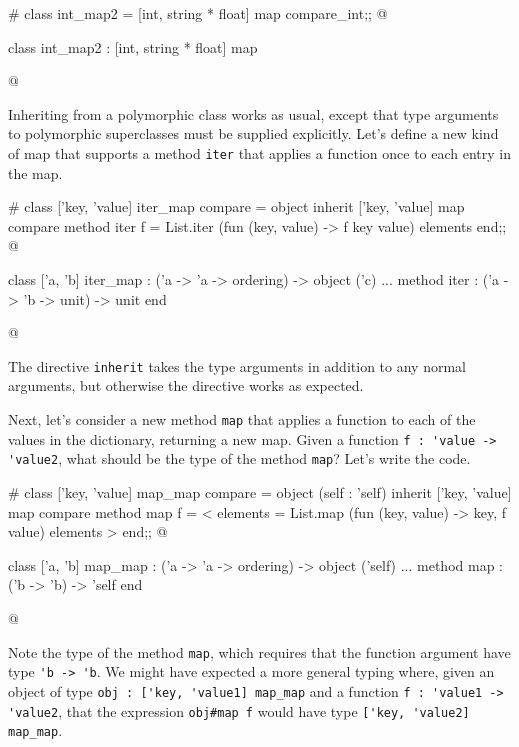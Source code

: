 \begin{ocaml}
# class int_map2 = [int, string * float] map compare_int;;
@
\begin{topoutput}
class int_map2 : [int, string * float] map
\end{topoutput}
@
\end{ocaml}


Inheriting from a polymorphic class works as usual, except that type arguments
to polymorphic superclasses must be supplied explicitly.  Let's define
a new kind of map that supports a method \hbox{\lstinline$iter$} that applies a function
once to each entry in the map.

\begin{ocaml}
# class ['key, 'value] iter_map compare =
    object
      inherit ['key, 'value] map compare
      method iter f = List.iter (fun (key, value) -> f key value) elements
    end;;
@
\begin{topoutput}
class ['a, 'b] iter_map : ('a -> 'a -> ordering) ->
  object ('c)
    ...
    method iter : ('a -> 'b -> unit) -> unit
  end
\end{topoutput}
@
\end{ocaml}
%
The directive \hbox{\lstinline$inherit$} takes the type arguments in addition
to any normal arguments, but otherwise the directive works as
expected.

Next, let's consider a new method \hbox{\lstinline$map$} that applies a
function to each of the values in the dictionary, returning a new map.  Given
a function \hbox{\lstinline$f : 'value -> 'value2$}, what should be the type
of the method \hbox{\lstinline$map$}?  Let's write the code.

\begin{ocaml}
# class ['key, 'value] map_map compare =
  object (self : 'self)
    inherit ['key, 'value] map compare
    method map f =
      {< elements = List.map (fun (key, value) -> key, f value) elements >}
  end;;
@
\begin{topoutput}
class ['a, 'b] map_map : ('a -> 'a -> ordering) ->
  object ('self)
    ...
    method map : ('b -> 'b) -> 'self
  end
\end{topoutput}
@
\end{ocaml}
%
Note the type of the method \hbox{\lstinline$map$}, which requires that the
function argument have type \hbox{\lstinline$'b -> 'b$}.  We might have
expected a more general typing where, given an object of
type \hbox{\lstinline$obj : ['key, 'value1] map_map$} and a
function \hbox{\lstinline$f : 'value1 -> 'value2$}, that the
expression \hbox{\lstinline$obj#map f$} would have type
\hbox{\lstinline$['key, 'value2] map_map$}.  

